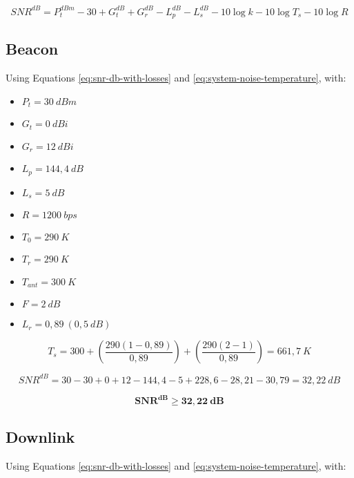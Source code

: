 \begin{equation} \label{eq:snr-db-with-losses}
    SNR^{dB} = P_{t}^{dBm} - 30 + G_{t}^{dB} + G_{r}^{dB} - L_{p}^{dB} - L_{s}^{dB} - 10\log k - 10\log T_{s} - 10\log R
\end{equation}

\subsection{Beacon}

Using Equations \ref{eq:snr-db-with-losses} and \ref{eq:system-noise-temperature}, with:

\begin{itemize}
    \item $P_{t} = 30\ dBm$
    \item $G_{t} = 0\ dBi$
    \item $G_{r} = 12\ dBi$
    \item $L_{p} = 144,4\ dB$
    \item $L_{s} = 5\ dB$
    \item $R = 1200\ bps$
    \item $T_{0} = 290\ K$
    \item $T_{r} = 290\ K$
    \item $T_{ant} = 300\ K$
    \item $F = 2\ dB$
    \item $L_{r} = 0,89\ (0,5\ dB)$
\end{itemize}

\begin{equation}
    T_{s} = 300 + \left( \frac{290 (1 - 0,89)}{0,89} \right) + \left( \frac{290 (2 - 1)}{0,89} \right) = 661,7\ K
\end{equation}

\begin{equation}
    SNR^{dB} = 30 - 30 + 0 + 12 - 144,4 - 5 + 228,6 - 28,21 - 30,79 = 32,22\ dB
\end{equation}

\begin{equation}
\mathbf{SNR^{dB} \geq 32,22\ dB}
\end{equation}

\subsection{Downlink}

Using Equations \ref{eq:snr-db-with-losses} and \ref{eq:system-noise-temperature}, with:

